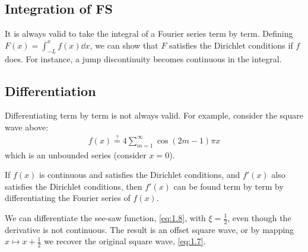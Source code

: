 \subsection{Integration of FS}
It is always valid to take the integral of a Fourier series term by term.
Defining $F(x) = \int_{-L}^x f(x) \dd{x}$, we can show that $F$ satisfies the Dirichlet conditions if $f$ does.
For instance, a jump discontinuity becomes continuous in the integral.

\subsection{Differentiation}
Differentiating term by term is not always valid.
For example, consider the square wave above:
\begin{align*}
    f(x) \stackrel{?}{=} 4 \sum_{m=1}^\infty \cos (2m-1)\pi x
\end{align*}
which is an unbounded series (consider $x = 0$).
\begin{theorem}
    If $f(x)$ is continuous and satisfies the Dirichlet conditions, and $f'(x)$ also satisfies the Dirichlet conditions, then $f'(x)$ can be found term by term by differentiating the Fourier series of $f(x)$.
\end{theorem}
\begin{example}
    We can differentiate the see-saw function, \cref{eq:1.8}, with $\xi = \frac{1}{2}$, even though the derivative is not continuous.
    The result is an offset square wave, or by mapping $x \mapsto x + \frac{1}{2}$ we recover the original square wave, \cref{eq:1.7}.
\end{example}

